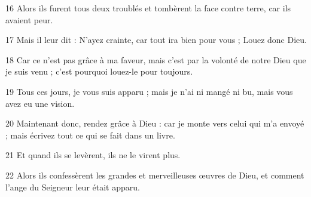 \par 16 Alors ils furent tous deux troublés et tombèrent la face contre terre, car ils avaient peur.
\par 17 Mais il leur dit : N'ayez crainte, car tout ira bien pour vous ; Louez donc Dieu.
\par 18 Car ce n'est pas grâce à ma faveur, mais c'est par la volonté de notre Dieu que je suis venu ; c'est pourquoi louez-le pour toujours.
\par 19 Tous ces jours, je vous suis apparu ; mais je n'ai ni mangé ni bu, mais vous avez eu une vision.
\par 20 Maintenant donc, rendez grâce à Dieu : car je monte vers celui qui m'a envoyé ; mais écrivez tout ce qui se fait dans un livre.
\par 21 Et quand ils se levèrent, ils ne le virent plus.
\par 22 Alors ils confessèrent les grandes et merveilleuses œuvres de Dieu, et comment l'ange du Seigneur leur était apparu.


